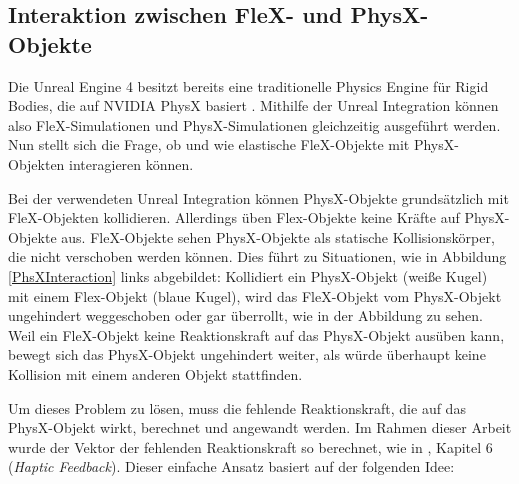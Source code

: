
  
\subsection{Interaktion zwischen FleX- und PhysX-Objekte}
\label{physXFleX}

 
Die Unreal Engine 4 besitzt bereits eine traditionelle Physics Engine für Rigid Bodies, die auf NVIDIA PhysX basiert \cite{ue4physics}. Mithilfe der Unreal Integration können also  FleX-Simulationen und PhysX-Simulationen gleichzeitig ausgeführt werden. Nun stellt sich die Frage, ob und wie elastische  FleX-Objekte mit PhysX-Objekten interagieren können.

Bei der verwendeten Unreal Integration können PhysX-Objekte grundsätzlich mit FleX-Objekten kollidieren. Allerdings üben Flex-Objekte keine Kräfte auf PhysX-Objekte aus. FleX-Objekte sehen PhysX-Objekte als statische Kollisionskörper, die nicht verschoben werden können. Dies führt zu Situationen, wie in Abbildung \ref{PhsXInteraction} links abgebildet: Kollidiert ein PhysX-Objekt (weiße Kugel) mit einem Flex-Objekt (blaue Kugel), wird das FleX-Objekt vom PhysX-Objekt ungehindert weggeschoben oder gar überrollt, wie in der Abbildung zu sehen. Weil ein FleX-Objekt keine Reaktionskraft auf das PhysX-Objekt ausüben kann, bewegt sich das PhysX-Objekt ungehindert weiter, als würde überhaupt keine Kollision mit einem anderen Objekt stattfinden.


Um dieses Problem zu lösen, muss die fehlende Reaktionskraft, die auf das PhysX-Objekt wirkt, berechnet und angewandt werden. 
Im Rahmen dieser Arbeit wurde der Vektor der fehlenden Reaktionskraft so berechnet, wie in \cite{VRSim20}, Kapitel 6 (\textit{Haptic Feedback}). Dieser einfache Ansatz basiert auf der folgenden Idee: 

